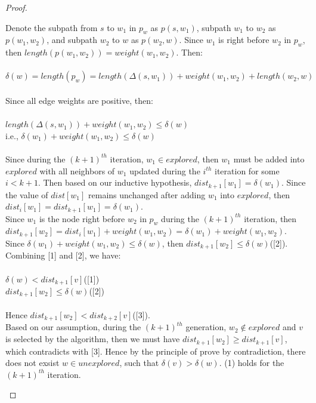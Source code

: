 \documentclass[11pt, a4paper]{article} %
\theoremstyle{definition}
\newcommand\tab[1][1cm]{\hspace*{#1}}
\newcommand\ftab[1][5cm]{\hspace*{#1}}
\begin{document}
\begin{proof}
\begin{enumerate}
Denote the subpath from $s$ to $w_1$ in $p_w$ as $p(s, w_1)$, subpath $w_1$ to $w_2$ as $p(w_1, w_2)$, and subpath $w_2$ to $w$ as $p(w_2, w)$. Since $w_1$ is right before $w_2$ in $p_w$, then $length(p(w_1, w_2)) = weight(w_1, w_2)$. Then: 
\\\\
  \tab $\delta(w) = length(p_w) = length(\Delta(s, w_1)) + weight(w_1, w_2) + length(w_2, w)$
\\\\
Since all edge weights are positive, then: 
\\\\
  \tab $length(\Delta(s, w_1)) + weight(w_1, w_2) \leq \delta(w)$\\
  \tab i.e., $\delta(w_1) + weight(w_1, w_2) \leq \delta(w)$
\\\\
Since during the $(k+1)^{th}$ iteration, $w_1 \in explored$, then $w_1$ must be added into $explored$ with all neighbors of $w_1$ updated during the $i^{th}$ iteration for some $i < k+1$. Then based on our inductive hypothesis, $dist_{k+1}[w_1] = \delta(w_1)$. Since the value of $dist[w_1]$ remains unchanged after adding $w_1$ into $explored$, then $dist_i[w_1] = dist_{k+1}[w_1] = \delta(w_1)$. 
\\
Since $w_1$ is the node right before $w_2$ in $p_w$ during the $(k+1)^{th}$ iteration, then $dist_{k+1}[w_2] = dist_{i}[w_1] + weight(w_1, w_2) = \delta(w_1) + weight(w_1, w_2)$. Since $\delta(w_1) + weight(w_1, w_2) \leq \delta(w)$, then $dist_{k+1}[w_2] \leq \delta(w)$([2]).
\\
Combining [1] and [2], we have: 
\\\\
\ftab $\delta(w) < dist_{k+1}[v]$([1])\\
\ftab $dist_{k+1}[w_2] \leq \delta(w)$([2])
\\\\
Hence $dist_{k+1}[w_2] < dist_{k+2}[v]$([3]). 
\\
Based on our assumption, during the $(k+1)^{th}$ generation, $w_2 \notin explored$ and $v$ is selected by the algorithm, then we must have $dist_{k+1}[w_2] \geq dist_{k+1}[v]$, which contradicts with [3]. Hence by the principle of prove by contradiction, there does not exsist $w \in unexplored$, such that $\delta(v) > \delta(w)$. (1) holds for the $(k+1)^{th}$ iteration. 


\end{enumerate}
\end{proof}
\end{document}
